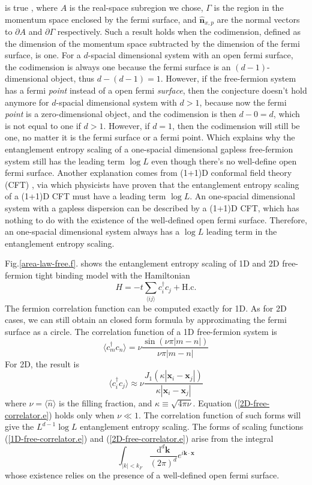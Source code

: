 \documentclass[12font]{article}
\theoremstyle{definition}
\numberwithin{equation}{section}
\newcommand{\anglelr}[1]{\langle #1 \rangle}
\newcommand{\llr}[1]{(  #1  )}
\newcommand{\lr}[1]{\left(  #1  \right)}
\newcommand{\abs}[1]{\left|  #1  \right|}
\newcommand{\de}{\partial}
\newcommand{\mrm}[1]{\mathrm{#1}}
\newcommand{\bo}[1]{\mathbf{#1}}
\begin{document}
is true \cite{FS-ee_2, Widom}, where $A$ is the real-space subregion we chose, $\Gamma$ is the region in the momentum space enclosed by the fermi surface, and $\hat{\bo{n}}_{x,p}$ are the normal vectors to $\de A$ and $\de\Gamma$ respectively. Such a result holds when the codimension, defined as the dimension of the momentum space subtracted by the dimension of the fermi surface, is one. For a $d$-spacial dimensional system with an open fermi surface, the codimension is always one because the fermi surface is an $(d-1)$-dimensional object, thus $d-(d-1) = 1$. However, if the free-fermion system has a fermi \emph{point} instead of a open fermi \emph{surface}, then the conjecture doesn't hold anymore for $d$-spacial dimensional system with $d>1$, because now the fermi \emph{point} is a zero-dimensional object, and the codimension is then $d-0=d$, which is not equal to one if $d>1$. However, if $d=1$, then the codimension will still be one, no matter it is the fermi surface or a fermi point. Which explains why the entanglement entropy scaling of a one-spacial dimensional gapless free-fermion system still has the leading term $\log L$ even though there's no well-define open fermi surface. Another explanation comes from (1+1)D conformal field theory (CFT) \cite{CFT_1, CFT_2, CFT_3}, via which physicists have proven that the entanglement entropy scaling of a (1+1)D CFT must have a leading term $\log L$. An one-spacial dimensional system with a gapless dispersion can be described by a (1+1)D CFT, which has nothing to do with the existence of the well-defined open fermi surface. Therefore, an one-spacial dimensional system always has a $\log L$ leading term in the entanglement entropy scaling.

Fig.\ref{area-law-free.f}. shows the entanglement entropy scaling of 1D and 2D free-fermion tight binding model with the Hamiltonian 
\[
H = -t\sum_{\anglelr{ij}}c^{\dagger}_ic_j + \mrm{H.c.}
\]
The fermion correlation function can be computed exactly for 1D. As for 2D cases, we can still obtain an closed form formula by approximating the fermi surface as a circle. The correlation function of a 1D free-fermion system is
\begin{equation}\label{1D-free-correlator.e}
\anglelr{c^\dagger_mc_n} = \nu\frac{\sin\lr{\nu\pi\abs{m-n}}}{\nu\pi\abs{m-n}}
\end{equation}
For 2D, the result is
\begin{equation}\label{2D-free-correlator.e}
  \anglelr{c^\dagger_ic_j} \approx \nu\frac{J_1\lr{\kappa\abs{\bo{x}_i - \bo{x}_j}}}{\kappa\abs{\bo{x}_i - \bo{x}_j}}
\end{equation}
where $\nu = \anglelr{\hat{n}}$ is the filling fraction, and $\kappa \equiv \sqrt{4\pi\nu}$. Equation (\ref{2D-free-correlator.e}) holds only when $\nu\ll 1$. The correlation function of such forms will give the $L^{d-1}\log L$ entanglement entropy scaling. The forms of scaling functions (\ref{1D-free-correlator.e}) and (\ref{2D-free-correlator.e}) arise from the integral
\[
\int_{\abs{k}<k_F}\frac{\mrm{d}^d\bo{k}}{\llr{2\pi}^d}e^{i\bo{k}\cdot \bo{x}}
\]
whose existence relies on the presence of a well-defined open fermi surface.
\end{document}
